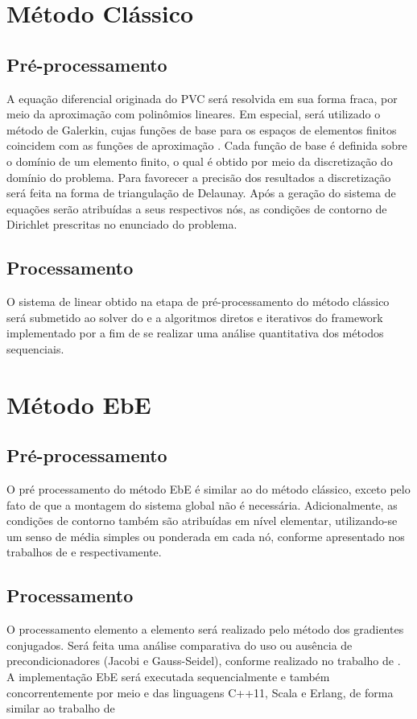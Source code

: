 	\section{Método Clássico}
	\subsection{Pré-processamento}
	
	A equação diferencial originada do PVC será resolvida em sua forma fraca, por meio da aproximação com polinômios lineares\cite{jin}. Em especial, será utilizado o método de Galerkin, cujas funções de base para os espaços de elementos finitos coincidem com as funções de aproximação \cite{jin}. Cada função de base é definida sobre o domínio de um elemento finito, o qual é obtido por meio da discretização  do domínio do problema. Para favorecer a precisão dos resultados a discretização será feita na forma de triangulação de Delaunay.	
	Após a geração do sistema de equações serão atribuídas a seus respectivos nós, as condições de contorno de Dirichlet prescritas no enunciado do problema. 
	
	\subsection{Processamento}
	O sistema de linear obtido na etapa de pré-processamento do método clássico será submetido ao solver do \matlab e a algoritmos diretos e iterativos do framework implementado por  a fim de se realizar uma análise quantitativa dos métodos sequenciais. 
	
	\section{Método EbE}
	\subsection{Pré-processamento}
	O pré processamento do método EbE é similar ao do método clássico, exceto pelo fato de que a montagem do sistema global não é necessária. Adicionalmente, as condições de contorno também são atribuídas em nível elementar, utilizando-se um senso de média simples ou ponderada em cada nó, conforme apresentado nos trabalhos de  e  respectivamente. 
	
	\subsection{Processamento}
	O processamento elemento a elemento será realizado pelo método dos gradientes conjugados. Será feita uma análise comparativa do uso ou ausência de precondicionadores (Jacobi e Gauss-Seidel), conforme realizado no trabalho de .
	A implementação EbE será executada sequencialmente e também concorrentemente por meio e das linguagens C++11, Scala e Erlang, de forma similar ao trabalho de 
	

